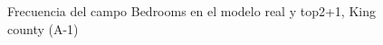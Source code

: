 \begin{figure}[H]
    \centering
    
    \caption{Frecuencia del campo Bedrooms en el modelo real y top2+1, King county (A-1)}
    \label{frecuency-top2+1-bedrooms}
\end{figure}